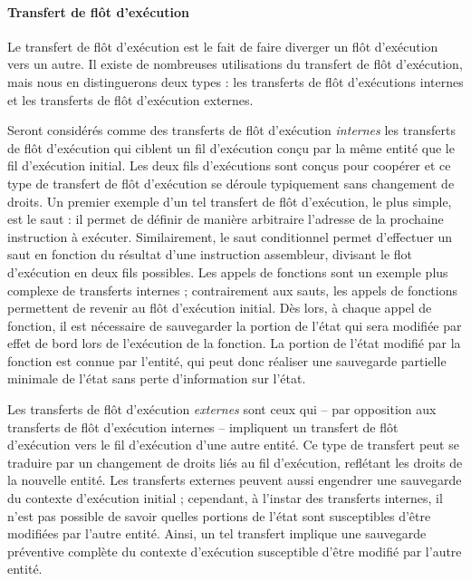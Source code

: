 		\paragraph{Transfert de flôt d'exécution}

			Le transfert de flôt d'exécution est le fait de faire diverger un flôt d'exécution vers un autre. Il existe de nombreuses utilisations du transfert de flôt d'exécution, mais nous en distinguerons deux types : les transferts de flôt d'exécutions internes et les transferts de flôt d'exécution externes.

			Seront considérés comme des transferts de flôt d'exécution \emph{internes} les transferts de flôt d'exécution qui ciblent un fil d'exécution conçu par la même entité que le fil d'exécution  initial. Les deux fils d'exécutions sont conçus pour coopérer et ce type de transfert de flôt d'exécution se déroule typiquement sans changement de droits. Un premier exemple d'un tel transfert de flôt d'exécution, le plus simple, est le saut : il permet de définir de manière arbitraire l'adresse de la prochaine instruction à exécuter. Similairement, le saut conditionnel permet d'effectuer un saut en fonction du résultat d'une instruction assembleur, divisant le flot d'exécution en deux fils possibles. Les appels de fonctions sont un exemple plus complexe de transferts internes ; contrairement aux sauts, les appels de fonctions permettent de revenir au flôt d'exécution initial. Dès lors, à chaque appel de fonction, il est nécessaire de sauvegarder la portion de l'état qui sera modifiée par effet de bord lors de l'exécution de la fonction.  La portion de l'état modifié par la fonction est connue par l'entité, qui peut donc réaliser une sauvegarde partielle minimale de l'état sans perte d'information sur l'état.

			Les transferts de flôt d'exécution \emph{externes} sont ceux qui -- par opposition aux transferts de flôt d'exécution internes -- impliquent un transfert de flôt d'exécution vers le fil d'exécution d'une autre entité. Ce type de transfert peut se traduire par un changement de droits liés au fil d'exécution, reflétant les droits de la nouvelle entité. Les transferts externes peuvent aussi engendrer une sauvegarde du contexte d'exécution initial ; cependant, à l'instar des transferts internes, il n'est pas possible de savoir quelles portions de l'état sont susceptibles d'être modifiées par l'autre entité. Ainsi, un tel transfert implique une sauvegarde préventive complète du contexte d'exécution susceptible d'être modifié par l'autre entité.

